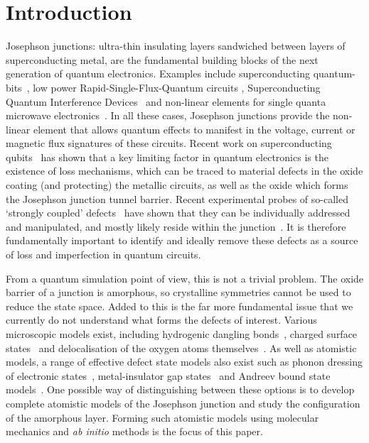 \section{Introduction}
Josephson junctions: ultra-thin insulating layers sandwiched between layers of superconducting metal, are the fundamental building blocks of the next generation of quantum electronics.
Examples include superconducting quantum-bits~\cite{Clarke1988,Martinis2002,Plourde2005,Deppe2007,Schreier2008}, low power Rapid-Single-Flux-Quantum circuits \cite{Mukhanov1987}, Superconducting Quantum Interference Devices~\cite{Weinstock1996} and non-linear elements for single quanta microwave electronics~\cite{Astafiev2007, Astafiev2010, Wilson2011, Hoi2013, Hoi2013a}.
In all these cases, Josephson junctions provide the non-linear element that allows quantum effects to manifest in the voltage, current or magnetic flux signatures of these circuits.
Recent work on superconducting qubits~\cite{Dutta1981, Shnirman2005} has shown that a key limiting factor in quantum electronics is the existence of loss mechanisms, which can be traced to material defects in the oxide coating (and protecting) the metallic circuits, as well as the oxide which forms the Josephson junction tunnel barrier.
Recent experimental probes of so-called `strongly coupled' defects~\cite{Neeley2008, Lupascu2009, Lisenfeld2010} have shown that they can be individually addressed and manipulated, and mostly likely reside within the junction~\cite{Lacquaniti2012}.
It is therefore fundamentally important to identify and ideally remove these defects as a source of loss and imperfection in quantum circuits.

From a quantum simulation point of view, this is not a trivial problem.
The oxide barrier of a junction is amorphous, so crystalline symmetries cannot be used to reduce the state space.
Added to this is the far more fundamental issue that we currently do not understand what forms the defects of interest.
Various microscopic models exist, including hydrogenic dangling bonds~\cite{Martinis2005,Jameson2011,Holder2013, Gordon2014}, charged surface states~\cite{Choi2009, Lee2014} and delocalisation of the oxygen atoms themselves~\cite{DuBois2013, DuBois2015}.
As well as atomistic models, a range of effective defect state models also exist such as phonon dressing of electronic states~\cite{Agarwal2013}, metal-insulator gap states~\cite{Choi2009} and Andreev bound state models~\cite{DeSousa2009}.
One possible way of distinguishing between these options is to develop complete atomistic models of the Josephson junction and study the configuration of the amorphous layer.
Forming such atomistic models using molecular mechanics and \textit{ab initio} methods is the focus of this paper.

